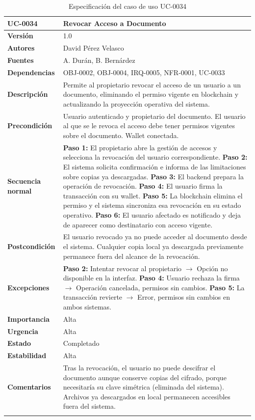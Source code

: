 \documentclass[11pt, a4paper]{article}
\begin{document}
\begin{longtable}{|p{4cm}|p{10cm}|}
\hline
\textbf{UC-0034} & Revocar Acceso a Documento \\
\hline
\textbf{Versión} & 1.0 \\
\hline
\textbf{Autores} & David Pérez Velasco \\
\hline
\textbf{Fuentes} & A. Durán, B. Bernárdez \\
\hline
\textbf{Dependencias} & OBJ-0002, OBJ-0004, IRQ-0005, NFR-0001, UC-0033 \\
\hline
\textbf{Descripción} & Permite al propietario revocar el acceso de un usuario a un documento, eliminando el permiso vigente en blockchain y actualizando la proyección operativa del sistema. \\
\hline
\textbf{Precondición} & Usuario autenticado y propietario del documento. El usuario al que se le revoca el acceso debe tener permisos vigentes sobre el documento. Wallet conectada. \\
\hline
\textbf{Secuencia normal} &
\textbf{Paso 1:} El propietario abre la gestión de accesos y selecciona la revocación del usuario correspondiente.\newline
\textbf{Paso 2:} El sistema solicita confirmación e informa de las limitaciones sobre copias ya descargadas.\newline
\textbf{Paso 3:} El backend prepara la operación de revocación.\newline
\textbf{Paso 4:} El usuario firma la transacción con su wallet.\newline
\textbf{Paso 5:} La blockchain elimina el permiso y el sistema sincroniza esa revocación en su estado operativo.\newline
\textbf{Paso 6:} El usuario afectado es notificado y deja de aparecer como destinatario con acceso vigente.\\
\hline
\textbf{Postcondición} & El usuario revocado ya no puede acceder al documento desde el sistema. Cualquier copia local ya descargada previamente permanece fuera del alcance de la revocación. \\
\hline
\textbf{Excepciones} &
\textbf{Paso 2:} Intentar revocar al propietario $\rightarrow$ Opción no disponible en la interfaz.\newline
\textbf{Paso 4:} Usuario rechaza la firma $\rightarrow$ Operación cancelada, permisos sin cambios.\newline
\textbf{Paso 5:} La transacción revierte $\rightarrow$ Error, permisos sin cambios en ambos sistemas.\\
\hline
\textbf{Importancia} & Alta \\
\hline
\textbf{Urgencia} & Alta \\
\hline
\textbf{Estado} & Completado \\
\hline
\textbf{Estabilidad} & Alta \\
\hline
\textbf{Comentarios} & Tras la revocación, el usuario no puede descifrar el documento aunque conserve copias del cifrado, porque necesitaría su clave simétrica (eliminada del sistema). Archivos ya descargados en local permanecen accesibles fuera del sistema. \\
\hline
\caption{Especificación del caso de uso UC-0034}
\end{longtable}
\end{document}
